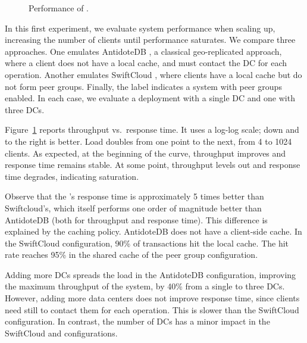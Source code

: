 
\begin{figure}
    \begin{center}
        \scalebox{0.7}{}
    \end{center}
    \caption{Performance of \system.}
    \label{fig:plot-performance}
\end{figure}

In this first experiment, we evaluate system performance when scaling
up, increasing the number of clients until performance saturates.
We compare three approaches.
One emulates AntidoteDB \cite{antidote-website}, a classical geo-replicated
approach, where a client does not have a local cache, and must contact
the DC for each operation.
Another emulates SwiftCloud \cite{rep:pan:sh177}, where
clients have a local cache but do not form peer groups.
Finally, the \system{} label indicates a system with peer groups
enabled.
In each case, we evaluate a deployment with a single DC and one with
three DCs.

Figure~\ref{fig:plot-performance} reports throughput vs.~response time.
It uses a log-log scale; down and to the right is better.
Load doubles from one point to the next, from 4 to 1024 clients.
As expected, at the beginning of the curve, throughput improves and
response time remains stable.
At some point, throughput levels out and response time degrades,
indicating saturation.

Observe that the \system{}'s response time is approximately 5 times
better than Swiftcloud's, which itself performs one order of magnitude
better than AntidoteDB (both for throughput and response time).
%
This difference is explained by the caching policy.
AntidoteDB does not have a client-side cache.
In the SwiftCloud configuration, 90\% of transactions hit the local
cache.
The hit rate reaches 95\% in the shared cache of the \system{} peer group
configuration.

Adding more DCs spreads the load in the AntidoteDB configuration,
improving the maximum throughput of the system, by 40\% from a single to
three DCs.
However, adding more data centers does not improve response time, 
since clients need still to contact them for each operation.
This is  slower than the SwiftCloud configuration.
%
In contrast, the number of DCs has a minor impact in the SwiftCloud and
\system{} configurations.
